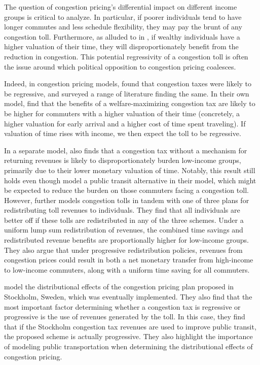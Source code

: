 \documentclass[JEL]{AEA}
\begin{document}
The question of congestion pricing's differential impact on different income groups is critical to analyze. In particular, if poorer individuals tend to have longer commutes and less schedule flexibility, they may pay the brunt of any congestion toll. Furthermore, as alluded to in \cite{arnott-1994}, if wealthy individuals have a higher valuation of their time, they will disproportionately benefit from the reduction in congestion. This potential regressivity of a congestion toll is often the issue around which political opposition to congestion pricing coalesces.

Indeed, in congestion pricing models, \cite{arnott-1994} found that congestion taxes were likely to be regressive, and surveyed a range of literature finding the same. In their own model, \cite{arnott-1994} find that the benefits of a welfare-maximizing congestion tax are likely to be higher for commuters with a higher valuation of their time (concretely, a higher valuation for early arrival and a higher cost of time spent traveling). If valuation of time rises with income, we then expect the toll to be regressive.

In a separate model, \cite{small-1983} also finds that a congestion tax without a mechanism for returning revenues is likely to disproportionately burden low-income groups, primarily due to their lower monetary valuation of time. Notably, this result still holds even though \cite{small-1983} model a public transit alternative in their model, which might be expected to reduce the burden on those commuters facing a congestion toll. However, \cite{small-1983} further models congestion tolls in tandem with one of three plans for redistributing toll revenues to individuals. They find that all individuals are better off if these tolls are redistributed in any of the three schemes. Under a uniform lump sum redistribution of revenues, the combined time savings and redistributed revenue benefits are proportionally higher for low-income groups. They also argue that under progressive redistribution policies, revenues from congestion prices could result in both a net monetary transfer from high-income to low-income commuters, along with a uniform time saving for all commuters.

\cite{eliasson-2006} model the distributional effects of the congestion pricing plan proposed in Stockholm, Sweden, which was eventually implemented. They also find that the most important factor determining whether a congestion tax is regressive or progressive is the use of revenues generated by the toll. In this case, they find that if the Stockholm congestion tax revenues are used to improve public transit, the proposed scheme is actually progressive. They also highlight the importance of modeling public transportation when determining the distributional effects of congestion pricing.
\end{document}
